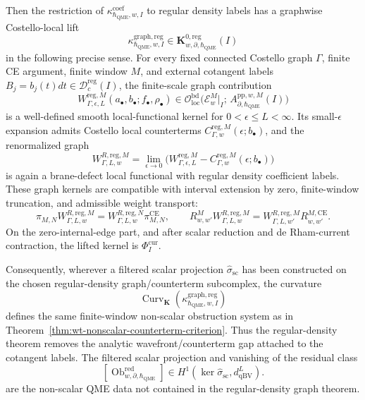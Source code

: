 \begin{prop}
  Then the restriction of
  \(\kappa^{\mathrm{coef}}_{\hbar_{\mathrm{QME}},w,I}\) to regular density labels has a
  graphwise Costello-local lift
  \[
    \kappa^{\mathrm{graph,reg}}_{\hbar_{\mathrm{QME}},w,I}
      \in
      \mathbf K^{0,\mathrm{reg}}_{w,\partial,\hbar_{\mathrm{QME}}}(I)
  \]
  in the following precise sense.
  For every fixed connected Costello graph \(\Gamma\), finite CE argument,
  finite window \(M\), and external cotangent labels
  \(B_j=b_j(t)dt\in\mathcal D^{\mathrm{reg}}_c(I)\), the finite-scale graph
  contribution
  \[
    W^{\mathrm{reg},M}_{\Gamma,\epsilon,L}
      (a_\bullet,b_\bullet;f_\bullet,\rho_\bullet)
      \in
      \mathcal O_{\mathrm{loc}}^{\mathrm{bd}}\bigl(
        \mathcal E_w^M|_I;\,
        A_{\partial,\hbar_{\mathrm{QME}}}^{\mathrm{pp},w,M}(I)\bigr)
  \]
  is a well-defined smooth local-functional kernel for
  \(0<\epsilon\leq L<\infty\).  Its small-\(\epsilon\) expansion admits
  Costello local counterterms
  \(C_{\Gamma,w}^{\mathrm{reg},M}(\epsilon;b_\bullet)\), and the
  renormalized graph
  \[
    W^{R,\mathrm{reg},M}_{\Gamma,L,w}
      =
      \lim_{\epsilon\to0}
      \bigl(
        W^{\mathrm{reg},M}_{\Gamma,\epsilon,L}
        -
        C_{\Gamma,w}^{\mathrm{reg},M}(\epsilon;b_\bullet)
      \bigr)
  \]
  is again a brane-defect local functional with regular density
  coefficient labels.  These graph kernels are compatible with interval
  extension by zero, finite-window truncation, and admissible weight
  transport:
  \[
    \pi_{M,N}W^{R,\mathrm{reg},M}_{\Gamma,L,w}
      =
      W^{R,\mathrm{reg},N}_{\Gamma,L,w}\pi^{\mathrm{CE}}_{M,N},
    \qquad
    R^M_{w,w'}W^{R,\mathrm{reg},M}_{\Gamma,L,w}
      =
      W^{R,\mathrm{reg},M}_{\Gamma,L,w'}R^{M,\mathrm{CE}}_{w,w'} .
  \]
  On the zero-internal-edge part, and after scalar reduction and
  de Rham-current contraction, the lifted kernel is
  \(\Phi_I^{\mathrm{cur}}\).

  Consequently, wherever a filtered scalar projection
  \(\widehat\sigma_{\mathrm{sc}}\) has been constructed on the chosen
  regular-density graph/counterterm subcomplex, the curvature
  \[
    \operatorname{Curv}_{\mathbf K}
      (\kappa^{\mathrm{graph,reg}}_{\hbar_{\mathrm{QME}},w,I})
  \]
  defines the same finite-window non-scalar obstruction system as in
  Theorem~\ref{thm:wt-nonscalar-counterterm-criterion}.  Thus the
  regular-density theorem removes the analytic wavefront/counterterm gap
  attached to the cotangent labels.  The filtered scalar projection and
  vanishing of the residual class
  \[
    [\operatorname{Ob}^{\mathrm{red}}_{w,\partial,\hbar_{\mathrm{QME}}}]
      \in
      H^1(\ker\widehat\sigma_{\mathrm{sc}},d_{\mathrm{qBV}}^L).
  \]
  are the non-scalar QME data not contained in the regular-density graph
  theorem.


\end{prop}

